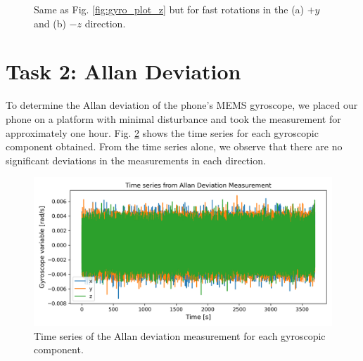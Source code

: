 \documentclass[a4paper]{report}
\numberwithin{equation}{section}
\begin{document}
\begin{figure}[hbt!]
	\centering
	\quad

	\caption{Same as Fig. \ref{fig:gyro_plot_z} but for fast rotations in the (a) $+y$ and (b) $-z$ direction.}
	\label{fig:gyro_plot_fast}
\end{figure}


\section{Task 2: Allan Deviation} \label{sec:prelab_allan_dev}

To determine the Allan deviation of the phone's MEMS gyroscope, we placed our phone on a platform with minimal disturbance and 
took the measurement for approximately one hour. Fig. \ref{fig:prelab_allan_time} shows the time series for each gyroscopic 
component obtained. From the time series alone, we observe that there are no significant deviations in the measurements in 
each direction. \par 

\begin{figure}[h!]
	\centering
	\includegraphics[width=0.75\columnwidth]{prelab_allan_time_series.png}

	\caption{Time series of the Allan deviation measurement for each gyroscopic component.}
	\label{fig:prelab_allan_time}
\end{figure}
\end{document}
